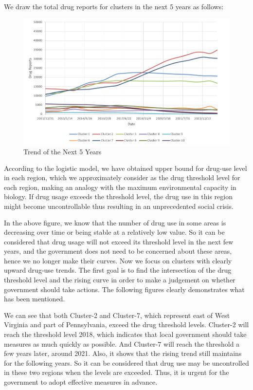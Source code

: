 \documentclass[12pt]{article}
\begin{document}
We draw the total drug reports for clusters in the next 5 years as follows:
\begin{figure}[H]
	\centering
	\includegraphics[scale=0.7]{./figures/5.png}
	\caption{Trend of the Next 5 Years}
	\label{Fig5}
\end{figure}

According to the logistic model, we have obtained upper bound for drug-use level in each region, which we approximately consider as the drug threshold level for each region, making an analogy with the maximum environmental capacity in biology. If drug usage exceeds the threshold level, the drug use in this region might become uncontrollable thus resulting in an unprecedented social crisis.

In the above figure, we know that the number of drug use in some areas is decreasing over time or being stable at a relatively low value. So it can be considered that drug usage will not exceed its threshold level in the next few years, and the government does not need to be concerned about these areas, hence we no longer make their curves. Now we focus on clusters with clearly upward drug-use trends. The first goal is to find the intersection of the drug threshold level and the rising curve in order to make a judgement on whether government should take actions. The following figures clearly demonstrates what has been mentioned.

We can see that both Cluster-2 and Cluster-7, which represent east of West Virginia and part of Pennsylvania, exceed the drug threshold levels. Cluster-2 will reach the threshold level 2018, which indicates that local government should take measures as much quickly as possible. And Cluster-7 will reach the threshold a few years later, around 2021. Also, it shows that the rising trend still maintains for the following years. So it can be considered that drug use may be uncontrolled in these two regions when the levels are exceeded. Thus, it is urgent for the government to adopt effective measures in advance.
\end{document}
